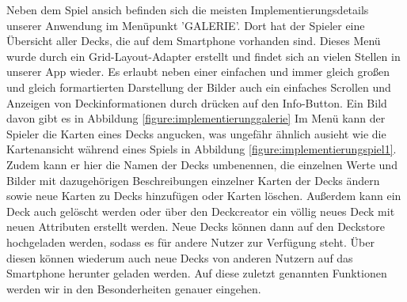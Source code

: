 Neben dem Spiel ansich befinden sich die meisten Implementierungsdetails unserer Anwendung im Menüpunkt 'GALERIE'. Dort hat der Spieler eine Übersicht aller Decks, die auf dem Smartphone vorhanden sind. Dieses Menü wurde durch ein Grid-Layout-Adapter erstellt und findet sich an vielen Stellen in unserer App wieder. Es erlaubt neben einer einfachen und immer gleich großen und gleich formartierten Darstellung der Bilder auch ein einfaches Scrollen und Anzeigen von Deckinformationen durch drücken auf den Info-Button. Ein Bild davon gibt es in Abbildung \ref{figure:implementierunggalerie} Im Menü kann der Spieler die Karten eines Decks angucken, was ungefähr ähnlich ausieht wie die Kartenansicht während eines Spiels in Abbildung \ref{figure:implementierungspiel1}. Zudem kann er hier die Namen der Decks umbenennen, die einzelnen Werte und Bilder mit dazugehörigen Beschreibungen einzelner Karten der Decks ändern sowie neue Karten zu Decks hinzufügen oder Karten löschen. Außerdem kann ein Deck auch gelöscht werden oder über den Deckcreator ein völlig neues Deck mit neuen Attributen erstellt werden. Neue Decks können dann auf den Deckstore hochgeladen werden, sodass es für andere Nutzer zur Verfügung steht. Über diesen können wiederum auch neue Decks von anderen Nutzern auf das Smartphone herunter geladen werden. Auf diese zuletzt genannten Funktionen werden wir in den Besonderheiten genauer eingehen.\\

